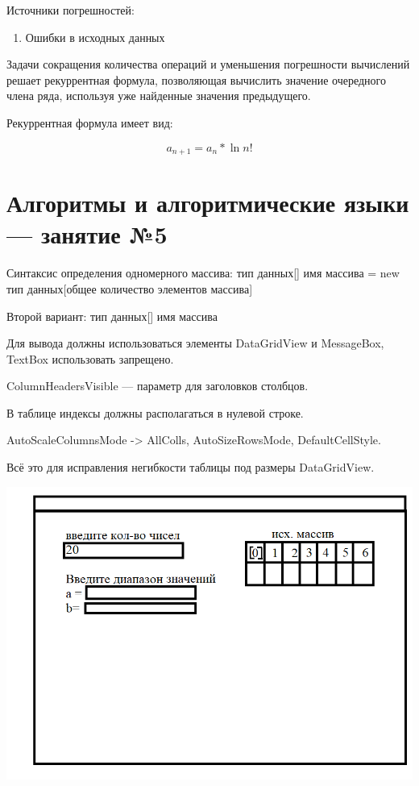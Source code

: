 \documentclass{article}
\begin{document}
Источники погрешностей:

\begin{enumerate}
    \item Ошибки в исходных данных
\end{enumerate}

Задачи сокращения количества операций и уменьшения погрешности вычислений решает рекуррентная формула, позволяющая вычислить значение очередного члена ряда, используя уже найденные значения предыдущего.

Рекуррентная формула имеет вид:

$$
a_{n + 1} = a_{n} * \ln n!
$$

\pagebreak
\section{Алгоритмы и алгоритмические языки — занятие №5}

Синтаксис определения одномерного массива: тип данных[] имя массива = new тип данных[общее количество элементов массива]

Второй вариант: тип данных[] имя массива

\hfill

Для вывода должны использоваться элементы DataGridView и MessageBox, TextBox использовать запрещено.

\hfill

ColumnHeadersVisible — параметр для заголовков столбцов.

В таблице индексы должны располагаться в нулевой строке.

AutoScaleColumnsMode -> AllColls, AutoSizeRowsMode, DefaultCellStyle.

Всё это для исправления негибкости таблицы под размеры DataGridView.

\hfill

\begin{center}
    \includegraphics[width=\textwidth]{images/image_05.png}
\end{center}
\end{document}
